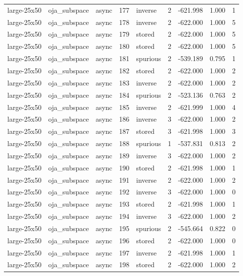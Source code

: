 \begin{tabular}{lllrlrrrr}
large-25x50 & oja\_subspace & async & 177 & inverse & 2 & -621.998 & 1.000 & 1 \\
large-25x50 & oja\_subspace & async & 178 & inverse & 2 & -622.000 & 1.000 & 5 \\
large-25x50 & oja\_subspace & async & 179 & stored & 2 & -622.000 & 1.000 & 5 \\
large-25x50 & oja\_subspace & async & 180 & stored & 2 & -622.000 & 1.000 & 5 \\
large-25x50 & oja\_subspace & async & 181 & spurious & 2 & -539.189 & 0.795 & 1 \\
large-25x50 & oja\_subspace & async & 182 & stored & 2 & -622.000 & 1.000 & 2 \\
large-25x50 & oja\_subspace & async & 183 & inverse & 2 & -622.000 & 1.000 & 2 \\
large-25x50 & oja\_subspace & async & 184 & spurious & 2 & -523.136 & 0.763 & 2 \\
large-25x50 & oja\_subspace & async & 185 & inverse & 2 & -621.999 & 1.000 & 4 \\
large-25x50 & oja\_subspace & async & 186 & inverse & 3 & -622.000 & 1.000 & 2 \\
large-25x50 & oja\_subspace & async & 187 & stored & 3 & -621.998 & 1.000 & 3 \\
large-25x50 & oja\_subspace & async & 188 & spurious & 1 & -537.831 & 0.813 & 2 \\
large-25x50 & oja\_subspace & async & 189 & inverse & 3 & -622.000 & 1.000 & 2 \\
large-25x50 & oja\_subspace & async & 190 & stored & 2 & -621.998 & 1.000 & 1 \\
large-25x50 & oja\_subspace & async & 191 & inverse & 2 & -622.000 & 1.000 & 2 \\
large-25x50 & oja\_subspace & async & 192 & inverse & 3 & -622.000 & 1.000 & 0 \\
large-25x50 & oja\_subspace & async & 193 & stored & 2 & -621.998 & 1.000 & 1 \\
large-25x50 & oja\_subspace & async & 194 & inverse & 3 & -622.000 & 1.000 & 2 \\
large-25x50 & oja\_subspace & async & 195 & spurious & 2 & -545.664 & 0.822 & 0 \\
large-25x50 & oja\_subspace & async & 196 & stored & 2 & -622.000 & 1.000 & 0 \\
large-25x50 & oja\_subspace & async & 197 & inverse & 2 & -621.998 & 1.000 & 1 \\
large-25x50 & oja\_subspace & async & 198 & stored & 2 & -622.000 & 1.000 & 2 \\

\end{tabular}
